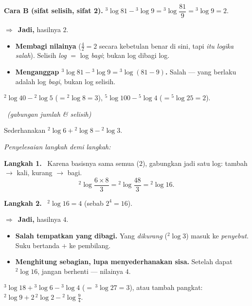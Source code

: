 \documentclass[11pt,a4paper]{report}
\theoremstyle{gaya}
\newcommand{\jawab}{\par\smallskip\noindent\textit{\textcolor{oranye}{Penyelesaian langkah demi langkah:}}\par\smallskip}
\newcommand{\langkah}[1]{\par\smallskip\noindent\textbf{\textcolor{biru}{Langkah #1.}}\ }
\newcommand{\jadi}{\par\smallskip\noindent$\Rightarrow$\ \textbf{Jadi, }}
\newcommand{\soalno}[2]{%
  \par\bigskip
  \noindent{\large\bfseries\color{ungu}\rule[-2pt]{4pt}{14pt}\ Soal #1}%
  \ {\normalfont\itshape\color{gray}(#2)}\par\nopagebreak\smallskip}
\begin{document}
\textbf{Cara B (sifat selisih, sifat 2).}
${}^{3}\!\log81 - {}^{3}\!\log9 = {}^{3}\!\log\dfrac{81}{9} = {}^{3}\!\log9 = 2.$
\jadi hasilnya $2$.

\begin{jebakan}
\begin{itemize}[leftmargin=*,topsep=2pt]
  \item \textbf{Membagi nilainya} ($\frac{4}{2}=2$ secara kebetulan benar di
  sini, tapi \emph{itu logika salah}). Selisih \emph{log} $=$ log \emph{bagi};
  bukan log dibagi log.
  \item \textbf{Menganggap ${}^3\!\log81 - {}^3\!\log9={}^3\!\log(81-9)$.} Salah
  --- yang berlaku adalah log \emph{bagi}, bukan log selisih.
\end{itemize}
\end{jebakan}

\begin{variasi}
${}^{2}\!\log40-{}^{2}\!\log5$ ($={}^{2}\!\log8=3$),
${}^{5}\!\log100-{}^{5}\!\log4$ ($={}^{5}\!\log25=2$).
\end{variasi}

\soalno{1.3.4}{gabungan jumlah \& selisih}
\begin{soalbox}{}
Sederhanakan ${}^{2}\!\log 6 + {}^{2}\!\log 8 - {}^{2}\!\log 3$.
\end{soalbox}

\jawab
\langkah{1} Karena basisnya sama semua ($2$), gabungkan jadi satu log: tambah
$\to$ kali, kurang $\to$ bagi.
\[
{}^{2}\!\log\frac{6\times 8}{3} = {}^{2}\!\log\frac{48}{3} = {}^{2}\!\log 16.
\]
\langkah{2} ${}^{2}\!\log16 = 4$ (sebab $2^4=16$).
\jadi hasilnya $4$.

\begin{jebakan}
\begin{itemize}[leftmargin=*,topsep=2pt]
  \item \textbf{Salah tempatkan yang dibagi.} Yang \emph{dikurang}
  (${}^{2}\!\log3$) masuk ke \emph{penyebut}. Suku bertanda $+$ ke pembilang.
  \item \textbf{Menghitung sebagian, lupa menyederhanakan sisa.} Setelah dapat
  ${}^{2}\!\log16$, jangan berhenti --- nilainya $4$.
\end{itemize}
\end{jebakan}

\begin{variasi}
${}^{3}\!\log 18 + {}^{3}\!\log 6 - {}^{3}\!\log 4$
($=\,{}^{3}\!\log 27=3$), atau tambah pangkat:
${}^{2}\!\log 9 + 2\,{}^{2}\!\log 2 - {}^{2}\!\log\tfrac94$.
\end{variasi}
\end{document}
